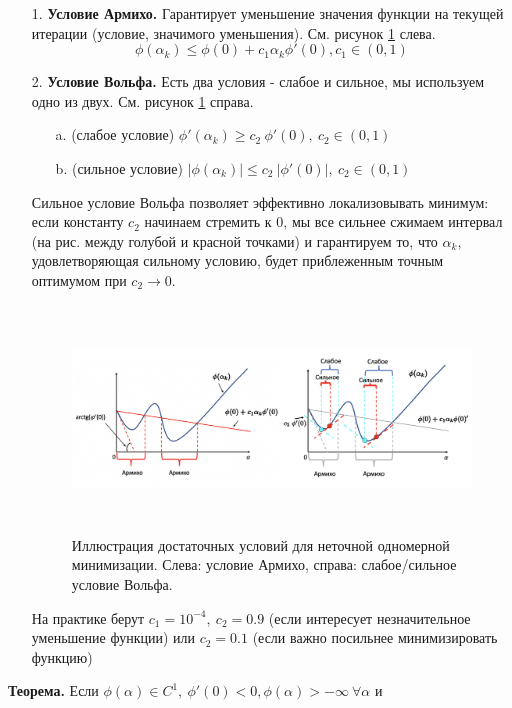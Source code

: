 \begin{itemize}
    \item[1.] \textbf{Условие Армихо.}
    Гарантирует уменьшение значения функции на текущей итерации (условие, значимого уменьшения). См. рисунок \ref{ris:im225} слева.
    $$\phi(\alpha_k) \leq \phi(0) + c_1 \alpha_k \phi'(0), c_1 \in (0,1) $$

    \item[2.] \textbf{Условие Вольфа.} Есть два условия - слабое и сильное, мы используем одно из двух. См. рисунок \ref{ris:im225} справа. \newline
    \begin{itemize}
        \item[a.] (слабое условие) $\phi'(\alpha_k)\geq c_2 \ \phi'(0), \ c_2 \in (0,1)$
        \item[b.] (сильное условие) $|\phi(\alpha_k)|\leq c_2 \ |\phi'(0)|, \ c_2 \in (0,1)$
    \end{itemize}
    Сильное условие Вольфа позволяет эффективно локализовывать минимум: если константу $c_2$ начинаем стремить к 0, мы все сильнее сжимаем интервал (на рис. между голубой и красной точками) и гарантируем то, что $\alpha_k$, удовлетворяющая сильному условию, будет приблеженным точным оптимумом при $c_2 \to 0$.
    \begin{figure}[hbt!]
        \centering
        \includegraphics[width=16cm, height=6cm]{images/im225.png}
        \caption{Иллюстрация достаточных условий для неточной одномерной минимизации. Слева: условие Армихо, справа: слабое/сильное условие Вольфа.}
        \label{ris:im225}
    \end{figure}
    \newline
    На практике берут $c_1=10^{-4}, \ c_2 = 0.9$ (если интересует незначительное уменьшение функции) или $c_2=0.1$ (если важно посильнее минимизировать функцию)
\end{itemize}
\textbf{Теорема.}
Если $\phi(\alpha)\in C^1, \ \phi'(0)<0, \phi(\alpha)>-\infty \ \forall \alpha$ и
